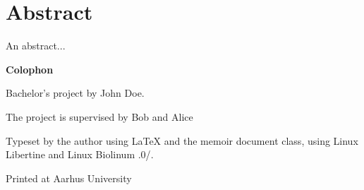 
\setcounter{page}{2}

\vspace*{0.5cm}
\section*{Abstract}
\thispagestyle{empty}

An abstract...



\makeatletter
\edef\fontandleading{\@memptsize.0/\the\baselineskip}
\makeatother

\strut\vfill
{
  \setlength{\parindent}{0pt}
  \addtolength{\parskip}{.6em}

  \begin{center}
    \bfseries\sffamily Colophon
  \end{center}

  \small

  \textsl{\projecttitle}

  \smallskip

  Bachelor's project by John Doe.

  The project is supervised by Bob and Alice

  Typeset by the author using \LaTeX{} and the \textsf{memoir} document class,
  using Linux Libertine and Linux Biolinum {\fontandleading}.

  Printed at Aarhus University
}